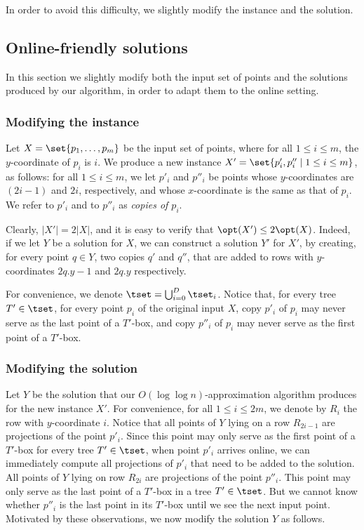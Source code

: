 \documentclass[11pt]{article}
\numberwithin{equation}{section}
\theoremstyle{definition}
\theoremstyle{plain}
\begin{document}
In order to avoid this difficulty, we slightly modify the instance and the solution. 


%
%


\subsection{Online-friendly solutions}
\label{sec: online-friendly}

In this section we slightly modify both the input set of points and the solutions produced by our algorithm, in order to adapt them to the online setting.

\subsubsection{Modifying the instance}

Let $X=\set{p_1,\ldots,p_m}$ be the input set of points, where for all $1\leq i\leq m$, the $y$-coordinate of $p_i$ is $i$. We produce a new instance $X'=\set{p_i',p_i''\mid 1\leq i\leq m}$, as follows: for all $1\leq i\leq m$, we let $p'_i$ and $p''_i$ be points whose $y$-coordinates are $(2i-1)$ and $2i$, respectively, and whose $x$-coordinate is the same as that of $p_i$. We refer to $p'_i$ and to $p''_i$ as \emph{copies of $p_i$}.
	
	Clearly, $|X'|=2|X|$, and it is easy to verify that $\opt(X')\leq 2\opt(X)$. Indeed, if we let $Y$ be a solution for $X$, we can construct a solution $Y'$ for $X'$, by creating, for every point $q\in Y$, two copies $q'$ and $q''$, that are added to rows with $y$-coordinates $2q.y-1$ and $2q.y$ respectively.

For convenience, we denote $\tset=\bigcup_{i=0}^D\tset_i$. Notice that, for every tree $T'\in \tset$, for every point $p_i$ of the original input $X$, copy $p'_i$ of $p_i$ may never serve as the last point of a $T'$-box, and copy $p''_i$ of $p_i$ may never serve as the first point of a $T'$-box.
	
	
\subsubsection{Modifying the solution}


Let $Y$ be the solution that our $O(\log\log n)$-approximation algorithm produces for the new instance $X'$. For convenience, for all $1\leq i\leq 2m$, we denote by $R_i$ the row with $y$-coordinate $i$. Notice that all points of $Y$ lying on a row $R_{2i-1}$ are projections of the point $p'_i$. Since this point may only serve as the first point of a $T'$-box for every tree $T'\in \tset$, when point $p'_i$ arrives online, we can immediately compute all projections of $p'_i$ that need to be added to the solution.
All points of $Y$ lying on row $R_{2i}$ are projections of the point $p''_i$. This point may only serve as the last point of a $T'$-box in a tree $T'\in \tset$. But we cannot know whether $p''_i$ is the last point in its $T'$-box until we see the next input point. Motivated by these observations, we now modify the solution $Y$ as follows.
\end{document}
